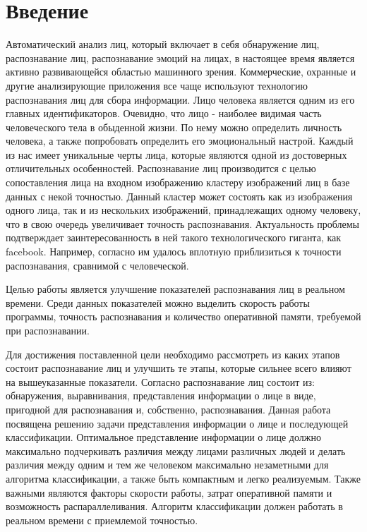 \documentclass[a4paper,12pt]{report}
\numberwithin{equation}{section}
\begin{document}
\section*{Введение} 
Автоматический анализ лиц, который включает в себя обнаружение лиц,
распознавание лиц, распознавание эмоций на лицах, в настоящее время является
активно развивающейся областью машинного зрения. Коммерческие, охранные и другие
анализирующие приложения все чаще используют технологию распознавания лиц для
сбора информации. Лицо человека является одним из его главных
идентификаторов. Очевидно, что лицо - наиболее видимая часть человеческого тела
в обыденной жизни. По нему можно определить личность человека, а также
попробовать определить его эмоциональный настрой. Каждый из нас имеет уникальные
черты лица, которые являются одной из достоверных отличительных
особенностей. Распознавание лиц производится с целью сопоставления лица на
входном изображению кластеру изображений лиц в базе данных с некой
точностью. Данный кластер может состоять как из изображения одного лица, так и
из нескольких изображений, принадлежащих одному человеку, что в свою очередь
увеличивает точность распознавания. Актуальность проблемы подтверждает
заинтересованность в ней такого технологического гиганта, как
facebook. Например, согласно \cite{DeepFace} им удалось вплотную приблизиться к
точности распознавания, сравнимой с человеческой.

Целью работы является улучшение показателей распознавания лиц в реальном
времени. Среди данных показателей можно выделить скорость работы программы,
точность распознавания и количество оперативной памяти, требуемой при
распознавании.


Для достижения поставленной цели необходимо рассмотреть из каких этапов состоит
распознавание лиц и улучшить те этапы, которые сильнее всего влияют на
вышеуказанные показатели. Согласно \cite{DeepFace} распознавание лиц состоит из:
обнаружения, выравнивания, представления информации о лице в виде, пригодной для
распознавания и, собственно, распознавания. Данная работа посвящена решению
задачи представления информации о лице и последующей классификации. Оптимальное
представление информации о лице должно максимально подчеркивать различия между
лицами различных людей и делать различия между одним и тем же человеком
максимально незаметными для алгоритма классификации, а также быть компактным и
легко реализуемым. Также важными являются факторы скорости работы, затрат
оперативной памяти и возможность распараллеливания. Алгоритм классификации
должен работать в реальном времени с приемлемой точностью.
\end{document}
